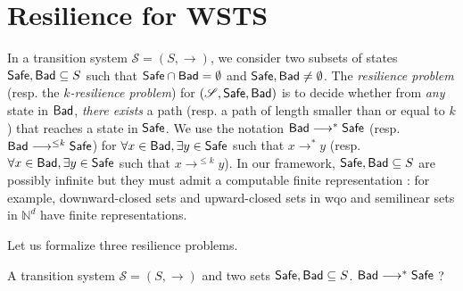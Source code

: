 
\section{Resilience for WSTS}




In a transition system $\mathscr{S}=(S,\rightarrow)$, we consider two subsets of states $\textsf{Safe}, \textsf{Bad} \subseteq S$ such that $\textsf{Safe} \cap  \textsf{Bad} = \emptyset$ and $\textsf{Safe} ,  \textsf{Bad} \neq \emptyset$.
The \emph{resilience problem} (resp. the \emph{$k$-resilience problem}) for $(\mathscr{S},\textsf{Safe},\textsf{Bad})$ is to decide whether from \emph{any} state in $\textsf{Bad}$, \emph{there exists} a path (resp. a path of length smaller than or equal to $k$) that reaches a state in $\textsf{Safe}$. We use the notation $\textsf{Bad} \longrightarrow^{*} \textsf{Safe}$ (resp. $\textsf{Bad} \longrightarrow^{\leq k} \textsf{Safe}$) for $\forall x \in \textsf{Bad}, \exists y \in \textsf{Safe}$ such that $x \longrightarrow^{*} y$ (resp.  $\forall x \in \textsf{Bad}, \exists y \in \textsf{Safe}$ such that $x \longrightarrow^{\leq k} y$). In our framework, $\textsf{Safe}, \textsf{Bad} \subseteq S$  are possibly infinite but they must admit a computable finite representation : for example, downward-closed sets and upward-closed sets in wqo and semilinear sets in $\mathbb{N}^d$ have finite representations. 





Let us formalize three resilience problems.


{A transition system $\mathscr{S}=(S,\rightarrow)$ and two sets $\textsf{Safe}, \textsf{Bad} \subseteq S$.}
{$\textsf{Bad} \longrightarrow^{*} \textsf{Safe}$ ?\newline}



